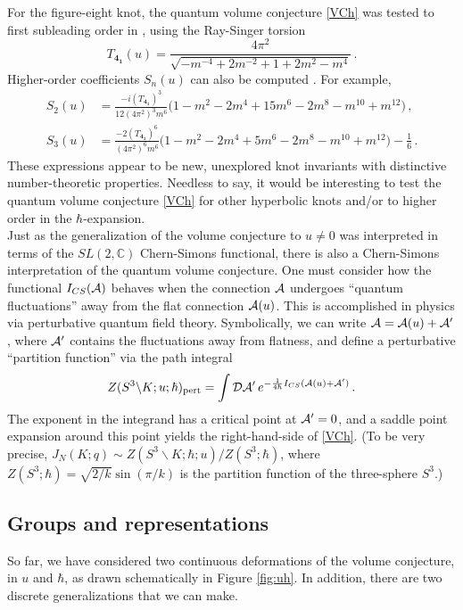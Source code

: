 \documentclass[letterpaper,12pt]{article}
\numberwithin{equation}{section}
\newcommand{\mb}{\mathbf}
\newcommand{\be}{\begin{equation}}
\newcommand{\ee}{\end{equation}}
\newcommand{\bs}{\backslash}
\newcommand{\C}{{\mathbb{C}}}
\newcommand{\CA}{{\cal A}}
\renewcommand{\CD}{{\cal D}}
\renewcommand{\=}{\;=\;}
\begin{document}
For the figure-eight knot, the quantum volume conjecture \eqref{VCh} was tested to first subleading order in \cite{gukov-2006}, using the Ray-Singer torsion
%
\be T_{\mb{4_1}}(u) = \frac{4\pi^2}{\sqrt{-m^{-4}+2m^{-2}+1+2m^{2}-m^{4}}}\,. \ee
%
Higher-order coefficients $S_n(u)$ can also be computed \cite{DGLZ}. For example,
%
\begin{align} S_2(u) &= \frac{-i(T_{\mb{4_1}})^3}{12(4\pi^2)^3m^6}\big(1-m^2-2m^4+15m^6-2m^8-m^{10}+m^{12}\big)\,, \\
  S_3(u) &= \frac{-2(T_{\mb{4_1}})^6}{(4\pi^2)^6m^6}\big(1-m^2-2m^4+5m^6-2m^8-m^{10}+m^{12}\big)-\frac16\,.
\end{align}
%
These expressions appear to be new, unexplored knot invariants with distinctive number-theoretic properties.
Needless to say, it would be interesting to test the quantum volume conjecture \eqref{VCh}
for other hyperbolic knots and/or to higher order in the $\hbar$-expansion. \\

Just as the generalization of the volume conjecture to $u\neq 0$
was interpreted in terms of the $SL(2,\C)$ Chern-Simons functional,
there is also a Chern-Simons interpretation of the quantum volume conjecture.
One must consider how the functional $I_{CS}(\CA)$ behaves when
the connection $\CA$ undergoes ``quantum fluctuations'' away from the flat connection $\CA(u)$.
This is accomplished in physics via perturbative quantum field theory.
Symbolically, we can write $\CA=\CA(u)+\CA'$, where $\CA'$ contains
the fluctuations away from flatness, and define a perturbative ``partition function'' via the path integral
%
\be Z(S^3\bs K;u;\hbar)_{\rm pert} = \int \CD\CA'\,e^{-\frac{1}{4\hbar}I_{CS}(\CA(u)+\CA')}\,. \label{path2} \ee
%
The exponent in the integrand has a critical point at $\CA'=0$, and a saddle point expansion around this point yields the right-hand-side of \eqref{VCh}.
(To be very precise, $J_N(K;q)\sim Z(S^3\bs K;\hbar;u)/Z(S^3;\hbar)$, where $Z(S^3;\hbar) = \sqrt{2/k}\sin(\pi/k)$ is the partition function of the three-sphere $S^3$.)




\subsection{Groups and representations}

So far, we have considered two continuous deformations of the volume conjecture, in $u$ and $\hbar$, as drawn schematically in Figure \ref{fig:uh}. In addition, there are two discrete generalizations that we can make.
\end{document}
